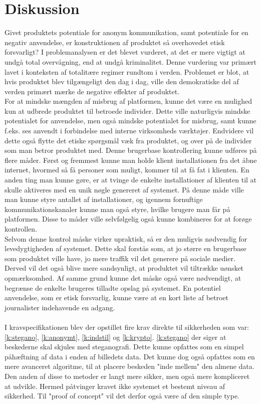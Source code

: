 \section{Diskussion}
Givet produktets potentiale for anonym kommunikation, samt potentiale for en negativ anvendelse, er konstruktionen af produktet så overhovedet etisk forsvarligt? I problemanalysen er det blevet vurderet, at det er mere vigtigt at undgå total overvågning, end at undgå kriminalitet. Denne vurdering var primært lavet i konteksten af totalitære regimer rundtom i verden. Problemet er blot, at hvis produktet blev tilgængeligt den dag i dag, ville den demokratiske del af verden primært mærke de negative effekter af produktet.\\
For at mindske mængden af misbrug af platformen, kunne det være en mulighed kun at udbrede produktet til betroede individer. Dette ville naturligvis mindske potentialet for anvendelse, men også mindske potentialet for misbrug, samt kunne f.eks. ses anvendt i forbindelse med interne virksomheds værktøjer. Endvidere vil dette også flytte det etiske spørgsmål væk fra produktet, og over på de individer som man betror produktet med. 
Denne brugerbase kontrollering kunne udføres på flere måder. Først og fremmest kunne man holde klient installationen fra det åbne internet, hvormed så få personer som muligt, kommer til at få fat i klienten. En anden ting man kunne gøre, er at tvinge de enkelte installationer af klienten til at skulle aktiveres med en unik nøgle genereret af systemet. På denne måde ville man kunne styre antallet af installationer, og igennem fornuftige kommunikationskanaler kunne man også styre, hvilke brugere man får på platformen. Disse to måder ville selvfølgelig også kunne kombineres for at forøge kontrollen.\\
Selvom denne kontrol måske virker upraktisk, så er den muligvis nødvendig for levedygtigheden af systemet. Dette skal forstås som, at jo større en brugerbase som produktet ville have, jo mere traffik vil det generere på sociale medier. Derved vil det også blive mere sandsynligt, at produktet vil tiltrække uønsket opmærksomhed. Af samme grund kunne det måske også være nødvendigt, at begrænse de enkelte brugeres tilladte opslag på systemet. En potentiel anvendelse, som er etisk forsvarlig, kunne være at en kort liste af betroet journalister indehavende en adgang.
\\\\
I kravspecifikationen blev der opstillet fire krav direkte til sikkerheden som var: \ref{k:stegano}, \ref{k:anonymt}, \ref{k:indstil} og \ref{k:krypto}. \ref{k:stegano} der siger at beskederne skal skjules med steganografi. Dette kunne opfattes som en simpel påhæftning af data i enden af billedets data. Det kunne dog også opfattes som en mere avanceret algoritme, til at placere beskeden "inde mellem" den almene data. Den anden af disse to metoder er langt mere sikker, men også mere kompliceret at udvikle. Hermed påtvinger kravet ikke systemet et bestemt niveau af sikkerhed. Til "proof of concept" vil det derfor også være af den simple type. \\

